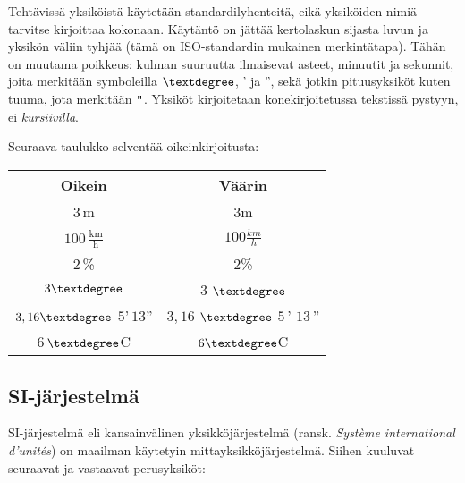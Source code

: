 Tehtävissä yksiköistä käytetään standardilyhenteitä, eikä yksiköiden nimiä tarvitse kirjoittaa kokonaan. Käytäntö on jättää kertolaskun sijasta luvun ja yksikön väliin tyhjää (tämä on ISO-standardin mukainen merkintätapa). %
Tähän on muutama poikkeus: kulman suuruutta ilmaisevat asteet, minuutit ja sekunnit, joita merkitään symboleilla $\textdegree$, ' ja '', sekä jotkin pituusyksiköt kuten tuuma, jota merkitään ${\verb+"+}$. Yksiköt kirjoitetaan konekirjoitetussa tekstissä pystyyn, ei \textit{kursiivilla}.



\begin{esimerkki}
Seuraava taulukko selventää oikeinkirjoitusta:
\begin{center}
\begin{tabular}{c|c}
Oikein & Väärin \\
\hline
$3$\,m & $3$m 	\\
$100$\,$\frac{\text{km}}{\text{h}}$ & $100\frac{km}{h}$	\\
$2$\,\% & $2$\% \\
$3\textdegree$ & $3$ $\textdegree$\\
$3,16\textdegree$ $5$'\,$13$'' & $3,16$ $\textdegree$ $5$\,' $13$\,'' 	\\
$6$\,$\textdegree$C & $6\textdegree$C 	\\
\end{tabular}
\end{center}
\end{esimerkki}

\newpage
\subsection*{SI-järjestelmä}

SI-järjestelmä eli kansainvälinen yksikköjärjestelmä (ransk. \textit{Système international d'unités}) on maailman käytetyin mittayksikköjärjestelmä. Siihen kuuluvat seuraavat  ja vastaavat perusyksiköt:

